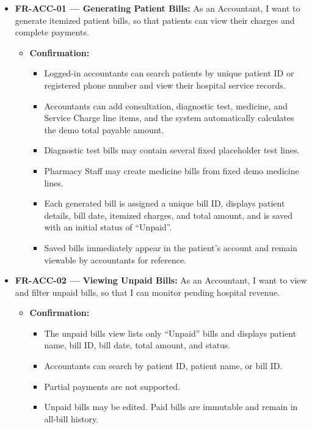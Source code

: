 \documentclass[11pt,a4paper]{article}
\begin{document}
\begin{itemize}
    \item \textbf{FR-ACC-01 — Generating Patient Bills:} As an Accountant, I want to generate itemized patient bills, so that patients can view their charges and complete payments.
    \begin{itemize}
        \item \textbf{Confirmation:}
        \begin{itemize}
            \item Logged-in accountants can search patients by unique patient ID or registered phone number and view their hospital service records.
            \item Accountants can add consultation, diagnostic test, medicine, and Service Charge line items, and the system automatically calculates the demo total payable amount.
            \item Diagnostic test bills may contain several fixed placeholder test lines.
            \item Pharmacy Staff may create medicine bills from fixed demo medicine lines.
            \item Each generated bill is assigned a unique bill ID, displays patient details, bill date, itemized charges, and total amount, and is saved with an initial status of ``Unpaid''.
            \item Saved bills immediately appear in the patient's account and remain viewable by accountants for reference.
        \end{itemize}
    \end{itemize}

    \item \textbf{FR-ACC-02 — Viewing Unpaid Bills:} As an Accountant, I want to view and filter unpaid bills, so that I can monitor pending hospital revenue.
    \begin{itemize}
        \item \textbf{Confirmation:}
        \begin{itemize}
            \item The unpaid bills view lists only ``Unpaid'' bills and displays patient name, bill ID, bill date, total amount, and status.
            \item Accountants can search by patient ID, patient name, or bill ID.
            \item Partial payments are not supported.
            \item Unpaid bills may be edited. Paid bills are immutable and remain in all-bill history.
        \end{itemize}
    \end{itemize}
\end{itemize}
\end{document}
